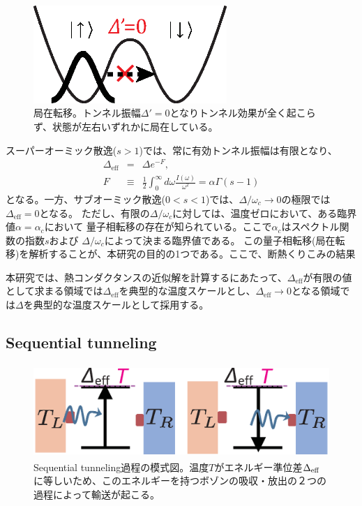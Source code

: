 \begin{figure}[tb]
	\centering
	\includegraphics[height=3.7cm]{localization.eps}
	\caption{局在転移。トンネル振幅$\Delta'=0$となりトンネル効果が全く起こらず、状態が左右いずれかに局在している。}
	\label{fig:localization}
\end{figure}

スーパーオーミック散逸($s>1$)では、常に有効トンネル振幅は有限となり、
\begin{eqnarray}
	\Delta_{\mathrm{eff}} &=& \Delta e^{-F}, \\
	F &\equiv&\frac{1}{2}\int_{0}^{\infty}d\omega\frac{I(\omega)}{\omega^2} = \alpha \Gamma(s-1)
	\label{super_ohmic_kurikomi}
\end{eqnarray}
となる。一方、サブオーミック散逸($0<s<1$)では、$\Delta/\omega_c \rightarrow 0$の極限では$\Delta_{\mathrm{eff}}=0$となる\cite{Leggett87}。
ただし、有限の$\Delta/\omega_c$に対しては、温度ゼロにおいて、ある臨界値$\alpha = \alpha_c$において
量子相転移の存在が知られている\cite{Vojta05}。ここで$\alpha_c$はスペクトル関数の指数$s$および
$\Delta/\omega_c$によって決まる臨界値である。
この量子相転移(局在転移)を解析することが、本研究の目的の1つである。ここで、断熱くりこみの結果

本研究では、熱コンダクタンスの近似解を計算するにあたって、$\Delta_{\mathrm{eff}}$が有限の値として求まる領域では$\Delta_{\mathrm{eff}}$を典型的な温度スケールとし、$\Delta_{\mathrm{eff}} \rightarrow 0$となる領域では$\Delta$を典型的な温度スケールとして採用する。

\subsection{Sequential tunneling}

\begin{figure}[tb]
	\centering
	\includegraphics[height=3.5cm]{sequential_tunneling.eps}
	\caption{Sequential tunneling過程の模式図。温度$T$がエネルギー準位差$\Delta_{\rm{eff}}$に等しいため、このエネルギーを持つボゾンの吸収・放出の２つの過程によって輸送が起こる。}
	\label{fig:sequential_tunneling}
\end{figure}

